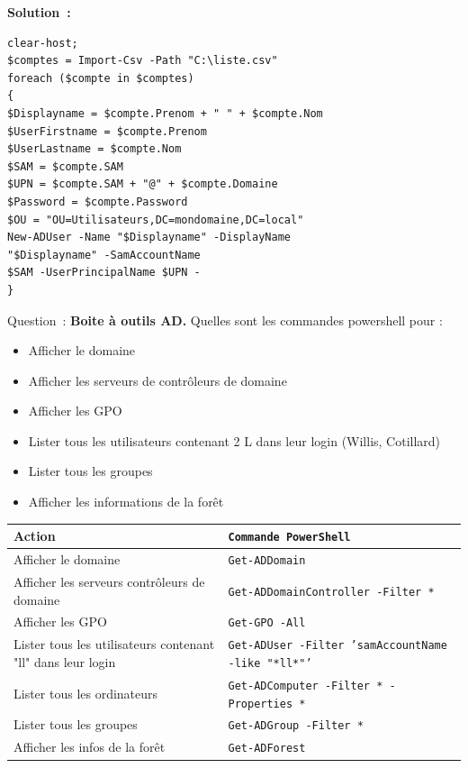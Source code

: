 \textbf{Solution~:}

\begin{verbatim}
clear-host;
$comptes = Import-Csv -Path "C:\liste.csv"
foreach ($compte in $comptes)
{
$Displayname = $compte.Prenom + " " + $compte.Nom
$UserFirstname = $compte.Prenom
$UserLastname = $compte.Nom
$SAM = $compte.SAM
$UPN = $compte.SAM + "@" + $compte.Domaine
$Password = $compte.Password
$OU = "OU=Utilisateurs,DC=mondomaine,DC=local"
New-ADUser -Name "$Displayname" -DisplayName
"$Displayname" -SamAccountName 
$SAM -UserPrincipalName $UPN -
}
\end{verbatim}

\vspace{0.5cm}

Question~: \textbf{Boite à outils AD.}
\noindent Quelles sont les commandes powershell pour :
\begin{itemize}
	\item Afficher le domaine
	\item Afficher les serveurs de contrôleurs de domaine
	\item Afficher les GPO
	\item Lister tous les utilisateurs contenant 2 L dans leur login (Willis, Cotillard)
	\item Lister tous les groupes
	\item Afficher les informations de la forêt
\end{itemize}

\vspace{0.5cm}

\begin{center}
	\begin{tabular}{|p{}|p{}|}
	\hline
	Action & \texttt{Commande PowerShell} \\ \hline
	Afficher le domaine & \texttt{Get-ADDomain} \\ \hline
	Afficher les serveurs contrôleurs de domaine & \texttt{Get-ADDomainController -Filter *} \\ \hline
	Afficher les GPO & \texttt{Get-GPO -All} \\ \hline
	Lister tous les utilisateurs contenant "ll" dans leur login & \texttt{Get-ADUser -Filter 'samAccountName -like "*ll*"'} \\ \hline
	Lister tous les ordinateurs & \texttt{Get-ADComputer -Filter * -Properties *} \\ \hline
	Lister tous les groupes & \texttt{Get-ADGroup -Filter *} \\ \hline
	Afficher les infos de la forêt & \texttt{Get-ADForest} \\ \hline
	\end{tabular}
\end{center}


